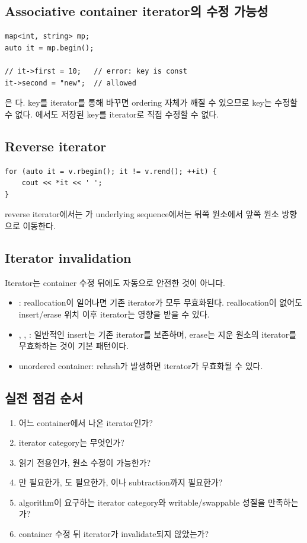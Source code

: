 \subsection{Associative container iterator의 수정 가능성}

\begin{lstlisting}
map<int, string> mp;
auto it = mp.begin();

// it->first = 10;   // error: key is const
it->second = "new";  // allowed
\end{lstlisting}

은 다. key를 iterator를 통해 바꾸면 ordering 자체가 깨질 수 있으므로 key는 수정할 수 없다. 에서도 저장된 key를 iterator로 직접 수정할 수 없다.

\subsection{Reverse iterator}

\begin{lstlisting}
for (auto it = v.rbegin(); it != v.rend(); ++it) {
    cout << *it << ' ';
}
\end{lstlisting}

reverse iterator에서는 가 underlying sequence에서는 뒤쪽 원소에서 앞쪽 원소 방향으로 이동한다.

\subsection{Iterator invalidation}
Iterator는 container 수정 뒤에도 자동으로 안전한 것이 아니다.

\begin{itemize}
\item {}: reallocation이 일어나면 기존 iterator가 모두 무효화된다. reallocation이 없어도 insert/erase 위치 이후 iterator는 영향을 받을 수 있다.
\item {}, , : 일반적인 insert는 기존 iterator를 보존하며, erase는 지운 원소의 iterator를 무효화하는 것이 기본 패턴이다.
\item unordered container: rehash가 발생하면 iterator가 무효화될 수 있다.
\end{itemize}

\subsection{실전 점검 순서}
\begin{enumerate}
\item 어느 container에서 나온 iterator인가?
\item iterator category는 무엇인가?
\item 읽기 전용인가, 원소 수정이 가능한가?
\item \code{++}만 필요한가, \code{--}도 필요한가, 이나 subtraction까지 필요한가?
\item algorithm이 요구하는 iterator category와 writable/swappable 성질을 만족하는가?
\item container 수정 뒤 iterator가 invalidate되지 않았는가?
\end{enumerate}


